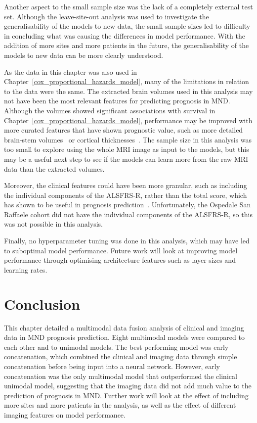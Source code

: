 Another aspect to the small sample size was the lack of a completely external test set.
Although the leave-site-out analysis was used to investigate the generalisability of the models to new data, the small sample sizes led to difficulty in concluding what was causing the differences in model performance.
With the addition of more sites and more patients in the future, the generalisability of the models to new data can be more clearly understood.

As the data in this chapter was also used in Chapter~\ref{cox_proportional_hazards_model}, many of the limitations in relation to the data were the same.
The extracted brain volumes used in this analysis may not have been the most relevant features for predicting prognosis in MND.
Although the volumes showed significant associations with survival in Chapter~\ref{cox_proportional_hazards_model}, performance may be improved with more curated features that have shown prognostic value, such as more detailed brain-stem volumes~\cite{milellaMedullaOblongataVolume2022} or cortical thicknesses~\cite{burghMultimodalLongitudinalStudy2020,dieckmannCorticalSubcorticalGrey2022}.
The sample size in this analysis was too small to explore using the whole MRI image as input to the models, but this may be a useful next step to see if the models can learn more from the raw MRI data than the extracted volumes.

Moreover, the clinical features could have been more granular, such as including the individual components of the ALSFRS-R, rather than the total score, which has shown to be useful in prognosis prediction~\cite{hothornRandomForest4LifeRandomForest2014}.
Unfortunately, the Ospedale San Raffaele cohort did not have the individual components of the ALSFRS-R, so this was not possible in this analysis.

Finally, no hyperparameter tuning was done in this analysis, which may have led to suboptimal model performance.
Future work will look at improving model performance through optimising architecture features such as layer sizes and learning rates.

\section{Conclusion}

This chapter detailed a multimodal data fusion analysis of clinical and imaging data in MND prognosis prediction.
Eight multimodal models were compared to each other and to unimodal models.
The best performing model was early concatenation, which combined the clinical and imaging data through simple concatenation before being input into a neural network.
However, early concatenation was the only multimodal model that outperformed the clinical unimodal model, suggesting that the imaging data did not add much value to the prediction of prognosis in MND.
Further work will look at the effect of including more sites and more patients in the analysis, as well as the effect of different imaging features on model performance.
